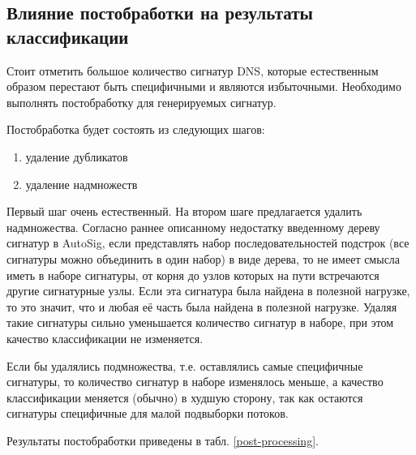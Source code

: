 \subsection{Влияние постобработки на результаты классификации}

Стоит отметить большое количество сигнатур DNS, которые естественным образом перестают быть специфичными и являются избыточными.
Необходимо выполнять постобработку для генерируемых сигнатур.

Постобработка будет состоять из следующих шагов:

\begin{enumerate}
    \item удаление дубликатов
    \item удаление надмножеств
\end{enumerate}

Первый шаг очень естественный. На втором шаге предлагается удалить надмножества.
Согласно раннее описанному недостатку введенному дереву сигнатур в AutoSig, если представлять набор последовательностей подстрок
(все сигнатуры можно объединить в один набор)
в виде дерева, то не имеет смысла иметь в наборе сигнатуры, от корня до узлов которых на пути встречаются другие сигнатурные узлы.
Если эта сигнатура была найдена в полезной нагрузке, то это значит, что и любая её часть была найдена в полезной нагрузке.
Удаляя такие сигнатуры сильно уменьшается количество сигнатур в наборе, при этом качество классификации не изменяется.

Если бы удалялись подмножества, т.е. оставлялись самые специфичные сигнатуры, то количество сигнатур в наборе изменялось меньше,
а качество классификации меняется (обычно) в худшую сторону, так как остаются сигнатуры специфичные для малой подвыборки потоков.


Результаты постобработки приведены в табл. \ref{post-processing}.

